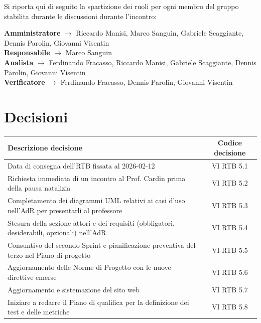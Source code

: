 \documentclass[a4paper,12pt]{article}
\newcommand{\ignoreglossary}{}
\begin{document}
Si riporta qui di seguito la spartizione dei ruoli per ogni membro del gruppo stabilita durante le discussioni durante l'incontro:
\begin{center}
    \textbf{Amministratore} $\rightarrow$ Riccardo Manisi, Marco Sanguin, Gabriele Scaggiante, Dennis Parolin, Giovanni Visentin\\
    \textbf{Responsabile} $\rightarrow$ Marco Sanguin\\
    \textbf{Analista} $\rightarrow$ Ferdinando Fracasso, Riccardo Manisi, Gabriele Scaggiante, Dennis Parolin, Giovanni Visentin\\
    \textbf{Verificatore} $\rightarrow$ Ferdinando Fracasso, Dennis Parolin, Giovanni Visentin
\end{center}

\section{Decisioni}
\begin{center}
\small
\renewcommand{\arraystretch}{1.2} 
\begin{tabular}{|p{}|c|}
\hline
\rowcolor{gray!60} 
\textbf{Descrizione decisione} & \textbf{Codice decisione} \\
\hline
\rowcolor{white}
Data di consegna dell'RTB fissata al 2026-02-12 & VI \ignoreglossary{RTB} 5.1 \\
\hline
\rowcolor{gray!20}
Richiesta immediata di un incontro al Prof. Cardin prima della pausa natalizia & VI \ignoreglossary{RTB} 5.2 \\
\hline
\rowcolor{white}
Completamento dei diagrammi UML relativi ai casi d'uso nell'AdR per presentarli al professore & VI \ignoreglossary{RTB} 5.3 \\
\hline
\rowcolor{gray!20}
Stesura della sezione attori e dei requisiti (obbligatori, desiderabili, opzionali) nell'AdR & VI \ignoreglossary{RTB} 5.4 \\
\hline
\rowcolor{white}
Consuntivo del secondo Sprint e pianificazione preventiva del terzo nel Piano di progetto & VI \ignoreglossary{RTB} 5.5 \\
\hline
\rowcolor{gray!20}
Aggiornamento delle Norme di Progetto con le nuove direttive emerse & VI \ignoreglossary{RTB} 5.6 \\
\hline
\rowcolor{gray!20}
Aggiornamento e sistemazione del sito web & VI \ignoreglossary{RTB} 5.7 \\
\hline
\rowcolor{white}
Iniziare a redarre il Piano di qualifica per la definizione dei test e delle metriche & VI \ignoreglossary{RTB} 5.8 \\
\hline
\end{tabular}
\end{center}
\end{document}

